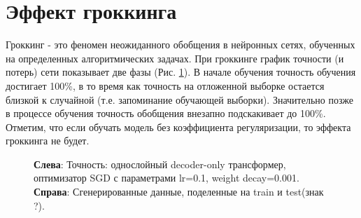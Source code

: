 \documentclass{article} %
\begin{document}
\section{Эффект гроккинга}
Гроккинг - это феномен неожиданного обобщения в нейронных сетях, обученных на определенных алгоритмических задачах. При гроккинге график точности (и потерь) сети показывает две фазы (Рис. \ref{fig:grokking_acc}). В начале обучения точность обучения достигает 100\%, в то время как точность на отложенной выборке остается близкой к случайной (т.е. запоминание обучающей выборки). Значительно позже в процессе обучения точность обобщения внезапно подскакивает до 100\%. Отметим, что если обучать модель без коэффициента регуляризации, то эффекта гроккинга не будет. 
\begin{figure}[!ht]
    \centering
    \caption{\textbf{Слева}: Точность: однослойный decoder-only трансформер, оптимизатор SGD с параметрами lr=0.1, weight decay=0.001. \textbf{Справа}: Сгенерированные данные, поделенные на train и test(знак ?).}
    \label{fig:grokking_acc}
\end{figure}
\end{document}
